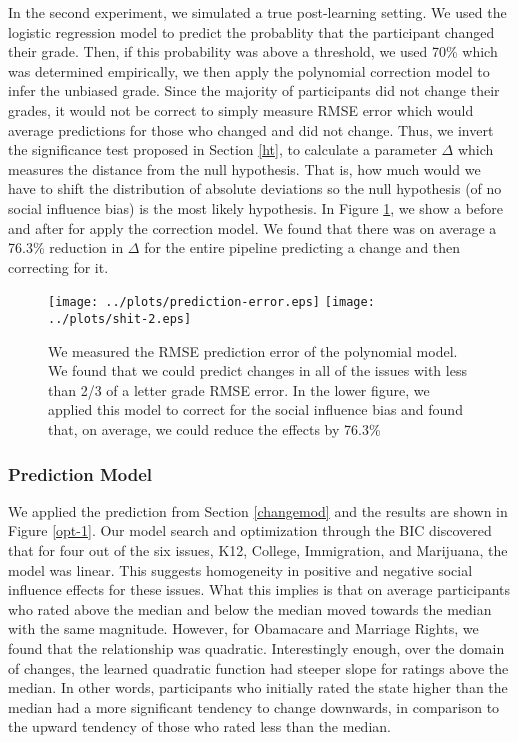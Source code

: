 In the second experiment, we simulated a true post-learning setting.
We used the logistic regression model to predict the probablity that the participant changed their grade.
Then, if this probability was above a threshold, we used 70\% which was determined empirically, we then apply the polynomial correction model
to infer the unbiased grade.
Since the majority of participants did not change their grades, it would not be correct to simply measure RMSE error which would average predictions for those who changed and did not change.
Thus, we invert the significance test proposed in Section \ref{ht}, to calculate a parameter $\Delta$ which measures the distance from the null hypothesis.
That is, how much would we have to shift the distribution of absolute deviations so the null hypothesis (of no social influence bias) is the most likely hypothesis.
In Figure \ref{poly-1}, we show a before and after for apply the correction model.
We found that there was on average a 76.3\% reduction in $\Delta$ for the entire pipeline predicting a change and then correcting for it. 

\begin{figure}[h]
\hspace*{-2em}
    \texttt{[image: ../plots/prediction-error.eps]}
    \hspace*{-2em}
    \texttt{[image: ../plots/shit-2.eps]}
      \caption{We measured the RMSE prediction error of the polynomial model. We found that we could predict changes in all of the issues with less than 2/3 of a letter grade RMSE error. In the lower figure, we applied this model to correct for the social influence bias and found that, on average, we could reduce the effects by 76.3\%}
      \label{poly-1}
\end{figure}

\subsubsection{Prediction Model}
We applied the prediction from Section \ref{changemod} and the results are shown in Figure \ref{opt-1}.
Our model search and optimization through the BIC discovered that for four out of the six issues, K12, College, Immigration, and Marijuana, the model was linear.
This suggests homogeneity in positive and negative social influence effects for these issues.
What this implies is that on average participants who rated above the median and below the median moved towards the median with the same magnitude.
However, for Obamacare and Marriage Rights, we found that the relationship was quadratic.
Interestingly enough, over the domain of changes, the learned quadratic function had steeper slope for ratings above the median.
In other words, participants who initially rated the state higher than the median had a more significant tendency to change downwards, in comparison to the upward tendency of those who rated less than the median.

